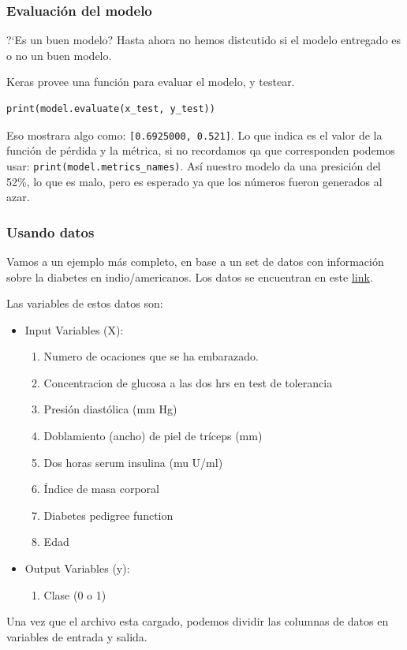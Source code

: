 \documentclass[9pt, xcolor=svgnames, dvipsnames]{beamer}
\begin{document}
\begin{frame}[fragile]
\frametitle{Evaluaci\'on del modelo}
?`Es un buen modelo? Hasta ahora no hemos distcutido si el modelo entregado es o no un buen modelo. 

Keras provee una funci\'on para evaluar el modelo, y testear.
\begin{verbatim}
print(model.evaluate(x_test, y_test))
\end{verbatim}
Eso mostrara algo como: \texttt{[0.6925000, 0.521]}. Lo que indica es el valor de la funci\'on de p\'erdida y la m\'etrica, si no recordamos qa que corresponden podemos usar: \texttt{print(model.metrics\_names)}. As\'i nuestro modelo da una presici\'on del 52\%, lo que es malo, pero es esperado ya que los n\'umeros fueron generados al azar.
\end{frame}

\begin{frame}[fragile]
\frametitle{Usando datos}
Vamos a un ejemplo m\'as completo, en base a un set de datos con informaci\'on sobre la diabetes en indio/americanos. Los datos se encuentran en este \href{https://raw.githubusercontent.com/jbrownlee/Datasets/master/pima-indians-diabetes.data.csv}{link}.

Las variables de estos datos son:

\begin{itemize}
    \item Input Variables (X):
    \begin{enumerate}
        \item Numero de ocaciones que se ha embarazado.
        \item Concentracion de glucosa a las dos hrs en test de tolerancia
        \item Presi\'on diast\'olica (mm Hg)
        \item Doblamiento (ancho) de piel de tr\'iceps (mm)
        \item Dos horas serum insulina (mu U/ml)
        \item \'Indice de masa corporal
        \item Diabetes pedigree function
        \item Edad
    \end{enumerate}
    \item Output Variables (y):
    \begin{enumerate}
        \item Clase (0 o 1)
    \end{enumerate}
\end{itemize}
Una vez que el archivo esta cargado, podemos dividir las columnas de datos en variables de entrada y salida.

\end{frame}
\end{document}

